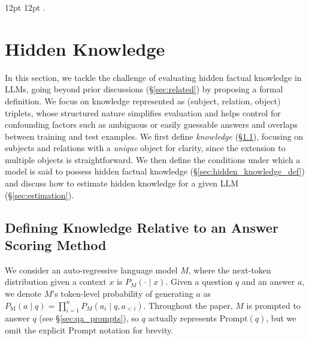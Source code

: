 


  {12pt}%
  {12pt}%
  {\itshape}%
  {}%
  {\bfseries}%
  {.}%
  {\newline}%
  {}%
\theoremstyle{break}
\newtheorem{definition}{Definition}

\vspace{-5pt}
\section{Hidden Knowledge}
\label{sec:definitions}
\vspace{-5pt}

In this section, we tackle the challenge of evaluating hidden factual knowledge in LLMs,
going beyond prior discussions
(\S \ref{sec:related}) by proposing a formal definition.
We focus on knowledge represented as {\small (subject, relation, object)} triplets, whose structured nature simplifies evaluation and helps control for confounding factors such as ambiguous or easily guessable answers and overlaps between training and test examples.
We first define \textit{knowledge} (\S \ref{sec:knowledge_def}), focusing on subjects and relations with a \textit{unique} object for clarity, since the extension to multiple objects is straightforward.
We then define the conditions under which a model is said to possess hidden factual knowledge (\S \ref{sec:hidden_knowledge_def}) and discuss how to 
estimate hidden knowledge for a given LLM (\S \ref{sec:estimation}).

\vspace{-5pt}
\subsection{Defining Knowledge Relative to an Answer Scoring Method}
\label{sec:knowledge_def}
\vspace{-5pt}

We consider an auto-regressive language model $M$, where the next-token distribution given a context $x$ is $P_M(\cdot \mid x)$. Given a question $q$ and an answer $a$, we denote $M$'s token-level probability of generating $a$ as $P_{\text{M}}(a \mid q)=\prod_{i=1}^{n} P_M(a_i \mid q, a_{<i})$. Throughout the paper, $M$ is prompted to answer $q$ (see \S \ref{sec:qa_prompts}),
so $q$ actually represents $\text{Prompt}(q)$, but we omit the explicit $\text{Prompt}$ notation for brevity.


